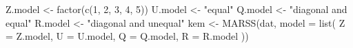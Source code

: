 \begin{Schunk}
\begin{Sinput}
 Z.model <- factor(c(1, 2, 3, 4, 5))
 U.model <- "equal"
 Q.model <- "diagonal and equal"
 R.model <- "diagonal and unequal"
 kem <- MARSS(dat, model = list(
   Z = Z.model,
   U = U.model, Q = Q.model, R = R.model
 ))
\end{Sinput}
\end{Schunk}
